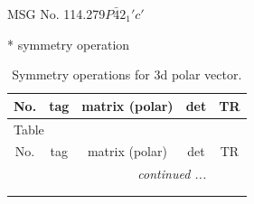 \documentclass[fleqn,8pt]{jsarticle}
\begin{document}
\setcounter{MaxMatrixCols}{32}

\renewcommand{\tablename}{Table~}
\renewcommand{\figurename}{Figure~}
\begin{center}
\LARGE
MSG No. 114.279\quad$P\bar{4}2_{1}'c'$
\end{center}
* symmetry operation
\renewcommand{\arraystretch}{1.3}
\begin{longtable}{ccccc}
\caption{Symmetry operations for 3d polar vector.}
 \\
 \hline \hline
No. & tag & matrix (polar) & det & TR \\ \hline \endfirsthead

\multicolumn{4}{l}{\tablename\ \thetable{}} \\
 \hline \hline
No. & tag & matrix (polar) & det & TR \\ \hline \endhead

 \hline \hline
\multicolumn{4}{r}{\footnotesize\it continued ...} \\ \endfoot

 \hline \hline
\multicolumn{4}{r}{} \\ \endlastfoot


\end{longtable}
\end{document}
